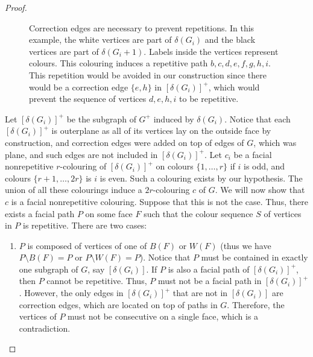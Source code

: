 \documentclass{patmorin}
\begin{document}
\begin{proof}
\begin{figure}[!ht]
  
  \caption{Correction edges are necessary to prevent repetitions. In this example, the white vertices are part of $\delta(G_i)$ and the black vertices are part of $\delta(G_i+1)$. Labels inside the vertices represent colours. This colouring induces a repetitive path $b,c,d,e,f,g,h,i$. This repetition would be avoided in our construction since there would be a correction edge $\{e,h\}$ in $[\delta(G_i)]^+$, which would prevent the sequence of vertices $d,e,h,i$ to be repetitive.}
  \label{fig:correction_edges}
  
  \end{figure}
 
 Let $[\delta(G_i)]^+$ be the subgraph of $G^+$ induced by $\delta(G_i)$. Notice that each $[\delta(G_i)]^+$ is outerplane as all of its vertices lay on the outside face by construction, and correction edges were added on top of edges of $G$, which was plane, and such edges are not included in $[\delta(G_i)]^+$.
 Let $c_i$ be a facial nonrepetitive $r$-colouring of $[\delta(G_i)]^+$ on colours $\{1,\ldots,r\}$ if $i$ is odd, and colours $\{r+1,\ldots,2r\}$ is $i$ is even. Such a colouring exists by our hypothesis. The union of all these colourings induce a $2r$-colouring $c$ of $G$. We will now show that $c$ is a facial nonrepetitive colouring.
 Suppose that this is not the case. Thus, there exists a facial path $P$ on some face $F$ such that the colour sequence $S$ of vertices in $P$ is repetitive. There are two cases:
 \begin{enumerate}
  \item $P$ is composed of vertices of one of $B(F)$ or $W(F)$ (thus we have $P \setminus{B(F)} = P$ or $P \setminus{W(F)} = P$). Notice that $P$ must be contained in exactly one subgraph of $G$, say $[\delta(G_i)]$. If $P$ is also a facial path of $[\delta(G_i)]^+$, then $P$ cannot be repetitive. Thus, $P$ must not be a facial path in $[\delta(G_i)]^+$. However, the only edges in $[\delta(G_i)]^+$ that are not in $[\delta(G_i)]$ are correction edges, which are located on top of paths in $G$. Therefore, the vertices of $P$ must not be consecutive on a single face, which is a contradiction.
  

\end{enumerate}
\end{proof}
\end{document}
